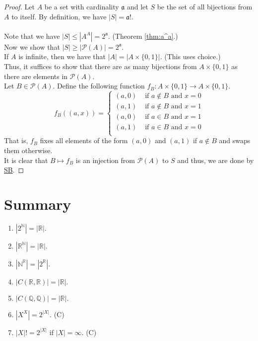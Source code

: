 \documentclass{article}
\begin{document}
\begin{proof} 
	Let $A$ be a set with cardinality $\mathfrak{a}$ and let $S$ be the set of all bijections from $A$ to itself. By definition, we have $|S| = \mathfrak{a}!.$\\~\\
	Note that we have $|S| \le |A^A| = 2^\mathfrak{a}.$ (Theorem \ref{thm:a^a}.)\\
	Now we show that $|S| \ge |\mathcal{P}(A)| = 2^\mathfrak{a}.$\\
	If $A$ is infinite, then we have that $|A| = |A \times \{0, 1\}|.$ (This uses choice.)\\
	Thus, it suffices to show that there are as many bijections from $A \times \{0, 1\}$ as there are elements in $\mathcal{P}(A).$\\
	Let $B \in \mathcal{P}(A).$ Define the following function $f_B : A\times \{0, 1\} \to A \times \{0, 1\}.$\\
	\[f_B\left((a, x)\right) = \left\{\begin{array}{rl}
		(a, 0) & \text{ if } a \notin B \text{ and } x = 0\\
		(a, 1) & \text{ if } a \notin B \text{ and } x = 1\\
		(a, 0) & \text{ if } a \in B \text{ and } x = 1\\
		(a, 1) & \text{ if } a \in B \text{ and } x = 0\\
	\end{array}
	\right.\]
	That is, $f_B$ fixes all elements of the form $(a, 0)$ and $(a, 1)$ if $a \notin B$ and swaps them otherwise.\\
	It is clear that $B \mapsto f_B$ is an injection from $\mathcal{P}(A)$ to $S$ and thus, we are done by \hyperref[thm:sb]{SB}.
\end{proof}

\section{Summary}
\begin{enumerate} 
	\item $|2^\mathbb{N}| = |\mathbb{R}|.$
	\item $|\mathbb{R}^\mathbb{N}| = |\mathbb{R}|.$
	\item $|\mathbb{N}^\mathbb{R}| = |2^\mathbb{R}|.$
	\item $|C(\mathbb{R}, \mathbb{R})| = |\mathbb{R}|.$
	\item $|C(\mathbb{Q}, \mathbb{Q})| = |\mathbb{R}|.$
	\item $|X^X| = 2^{|X|}.$ (C)
	\item $|X|! = 2^{|X|}$ if $|X| = \infty.$ (C)
\end{enumerate}
\end{document}
